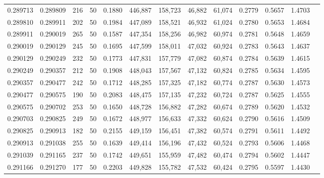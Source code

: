 \begin{tabular}{rrrrrrrrrrrrr}
0.289713 & 0.289809 &   216 &  50 &                                     0.1880 & 446,887 & 158,723 &  46,882 &  61,074 & 0.2779 & 0.5657 & 1.4703 \\
0.289810 & 0.289911 &   202 &  50 &                                     0.1984 & 447,089 & 158,521 &  46,932 &  61,024 & 0.2780 & 0.5653 & 1.4684 \\
0.289911 & 0.290019 &   265 &  50 &                                     0.1587 & 447,354 & 158,256 &  46,982 &  60,974 & 0.2781 & 0.5648 & 1.4659 \\
0.290019 & 0.290129 &   245 &  50 &                                     0.1695 & 447,599 & 158,011 &  47,032 &  60,924 & 0.2783 & 0.5643 & 1.4637 \\
0.290129 & 0.290249 &   232 &  50 &                                     0.1773 & 447,831 & 157,779 &  47,082 &  60,874 & 0.2784 & 0.5639 & 1.4615 \\
0.290249 & 0.290357 &   212 &  50 &                                     0.1908 & 448,043 & 157,567 &  47,132 &  60,824 & 0.2785 & 0.5634 & 1.4595 \\
0.290357 & 0.290477 &   242 &  50 &                                     0.1712 & 448,285 & 157,325 &  47,182 &  60,774 & 0.2787 & 0.5630 & 1.4573 \\
0.290477 & 0.290575 &   190 &  50 &                                     0.2083 & 448,475 & 157,135 &  47,232 &  60,724 & 0.2787 & 0.5625 & 1.4555 \\
0.290575 & 0.290702 &   253 &  50 &                                     0.1650 & 448,728 & 156,882 &  47,282 &  60,674 & 0.2789 & 0.5620 & 1.4532 \\
0.290703 & 0.290825 &   249 &  50 &                                     0.1672 & 448,977 & 156,633 &  47,332 &  60,624 & 0.2790 & 0.5616 & 1.4509 \\
0.290825 & 0.290913 &   182 &  50 &                                     0.2155 & 449,159 & 156,451 &  47,382 &  60,574 & 0.2791 & 0.5611 & 1.4492 \\
0.290913 & 0.291038 &   255 &  50 &                                     0.1639 & 449,414 & 156,196 &  47,432 &  60,524 & 0.2793 & 0.5606 & 1.4468 \\
0.291039 & 0.291165 &   237 &  50 &                                     0.1742 & 449,651 & 155,959 &  47,482 &  60,474 & 0.2794 & 0.5602 & 1.4447 \\
0.291166 & 0.291270 &   177 &  50 &                                     0.2203 & 449,828 & 155,782 &  47,532 &  60,424 & 0.2795 & 0.5597 & 1.4430 \\

\end{tabular}
